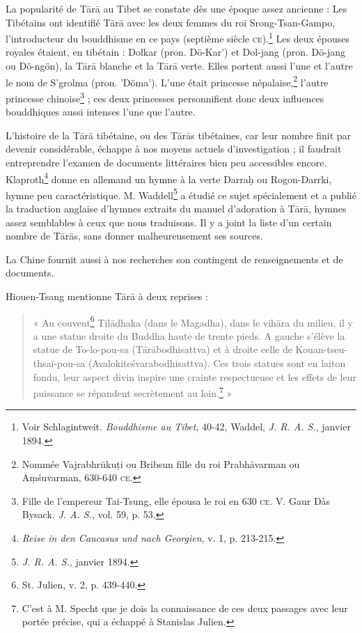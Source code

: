 \documentclass[a4paper, 11pt, oneside, french, landscape, twocolumn]{article}
\begin{document}
La popularité de T\={a}r\={a} au Tibet se constate dès une époque assez ancienne : Les Tibétains ont identifié T\={a}r\={a} avec les deux femmes du roi Srong-Tsan-Gampo, l'introducteur du bouddhisme en ce pays (septième siècle \textsc{ce}).\footnote{Voir Schlagintweit. \emph{Bouddhisme au Tibet}, 40-42, Waddel, \emph{J. R. A. S.}, janvier 1894.} Les deux épouses royales étaient, en tibétain : Dolkar (pron. Dö-Kar') et Dol-jang (pron. Dö-jang ou Dö-ngön), la T\={a}r\={a} blanche et la T\={a}r\={a} verte. Elles portent aussi l'une et l'autre le nom de S'grolma (pron. 'Döma'). L'une était princesse népalaise,\footnote{Nommée Vajrabhr\={u}ku\d{t}i ou Bribsun fille du roi Prabh\={a}varman ou A\d{m}\'{s}uvarman, 630-640 \textsc{ce}.} l'autre princesse chinoise\footnote{Fille de l'empereur Tai-Tsung, elle épousa le roi en 630 \textsc{ce}. V. Gaur Dàs Bysack. \emph{J. A. S.}, vol. 59, p. 53.} ; ces deux princesses personnifient donc deux influences bouddhiques aussi intenses l'une que l'autre.

L'histoire de la T\={a}r\={a} tibétaine, ou des T\={a}r\={a}s tibétaines, car leur nombre finit par devenir considérable, échappe à nos moyens actuels d'investigation ; il faudrait entreprendre l'examen de documents littéraires bien peu accessibles encore. Klaproth\footnote{\emph{Reise in den Caucasus und nach Georgien}, v. 1, p. 213-215.} donne en allemand un hymne à la verte Darra\d{h} ou Rogon-Darrki, hymne peu caractéristique. M. Waddell\footnote{\emph{J. R. A. S.}, janvier 1894.} a étudié ce sujet spécialement et a publié la traduction anglaise d'hymnes extraits du manuel d'adoration à T\={a}r\={a}, hymnes assez semblables à ceux que nous traduisons. Il y a joint la liste d'un certain nombre de T\={a}r\={a}s, sans donner malheureusement ses sources.

La Chine fournit aussi à nos recherches son contingent de renseignements et de documents.

Hiouen-Tsang mentionne T\={a}r\={a} à deux reprises :
\begin{quotation}\footnotesize
« Au couvent\footnote{St. Julien, v. 2, p. 439-440.} Til\={a}\d{d}haka (dans le Magadha), dans le vih\={a}ra du milieu, il y a une statue droite du Buddha haute de trente pieds. A gauche s'élève la statue de To-lo-pou-sa (T\={a}r\={a}bodhisattva) et à droite celle de Kouan-tseu-thsaï-pou-sa (Avalokite\'{s}varabodhisattva). Ces trois statues sont en laiton fondu, leur aspect divin inspire une crainte respectueuse et les effets de leur puissance se répandent secrètement au loin.\footnote{C'est à M. Specht que je dois la connaissance de ces deux passages avec leur portée précise, qui a échappé à Stanislas Julien.} »
\end{quotation}
\end{document}
